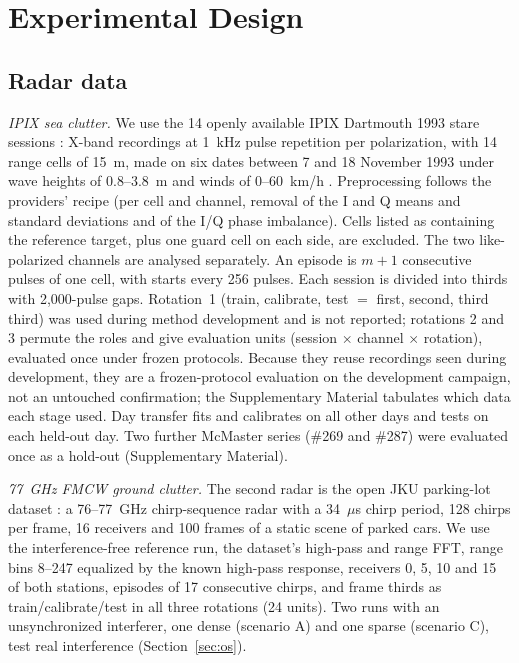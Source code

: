 \documentclass[journal]{IEEEtran}
\begin{document}
\section{Experimental Design}
\subsection{Radar data}
\emph{IPIX sea clutter.} We use the 14 openly available IPIX Dartmouth 1993 stare sessions \cite{ipixweb}: X-band recordings at 1~kHz pulse repetition per polarization, with 14 range cells of 15~m, made on six dates between 7 and 18 November 1993 under wave heights of 0.8--3.8~m and winds of 0--60~km/h \cite{haykin1995,farina1997,haykin2002}. Preprocessing follows the providers' recipe (per cell and channel, removal of the I and Q means and standard deviations and of the I/Q phase imbalance). Cells listed as containing the reference target, plus one guard cell on each side, are excluded. The two like-polarized channels are analysed separately. An episode is $m+1$ consecutive pulses of one cell, with starts every 256 pulses. Each session is divided into thirds with 2,000-pulse gaps. Rotation~1 (train, calibrate, test $=$ first, second, third third) was used during method development and is not reported; rotations 2 and 3 permute the roles and give \NUnitsConf{} evaluation units (session $\times$ channel $\times$ rotation), evaluated once under frozen protocols. Because they reuse recordings seen during development, they are a frozen-protocol evaluation on the development campaign, not an untouched confirmation; the Supplementary Material tabulates which data each stage used. Day transfer fits and calibrates on all other days and tests on each held-out day. Two further McMaster series (\#269 and \#287) were evaluated once as a hold-out (Supplementary Material).

\emph{77~GHz FMCW ground clutter.} The second radar is the open JKU parking-lot dataset \cite{jku2026}: a 76--77~GHz chirp-sequence radar with a 34~$\mu$s chirp period, 128 chirps per frame, 16 receivers and 100 frames of a static scene of parked cars. We use the interference-free reference run, the dataset's high-pass and range FFT, range bins 8--247 equalized by the known high-pass response, receivers 0, 5, 10 and 15 of both stations, episodes of 17 consecutive chirps, and frame thirds as train/calibrate/test in all three rotations (24 units). Two runs with an unsynchronized interferer, one dense (scenario A) and one sparse (scenario C), test real interference (Section~\ref{sec:os}).
\end{document}
